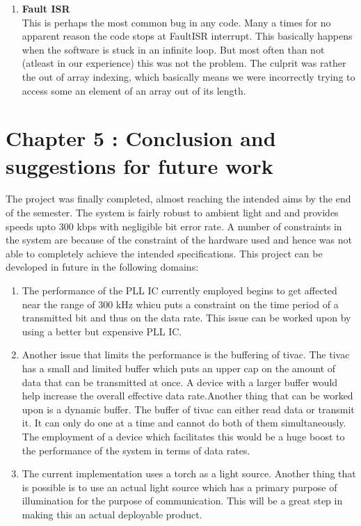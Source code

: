 \documentclass{article}
\begin{document}
\begin{enumerate}
\item \textbf{Fault ISR}\\
  This is perhaps the most common bug in any code. Many a times for no apparent reason the code stops at FaultISR interrupt. This basically happens when the software is stuck in an infinite loop. But most often than not (atleast in our experience) this was not the problem. The culprit was rather the out of array indexing, which basically means we were incorrectly trying to access some an element of an array out of its length. 
\end{enumerate}

\section{Chapter 5 : Conclusion and suggestions for future work}

The project was finally completed, almost reaching the intended aims by the end of the semester. The system is fairly robust to ambient light and and provides speeds upto $300$ kbps with negligible bit error rate. A number of constraints in the system are because of the constraint of the hardware used and hence was not able to completely achieve the intended specifications. This project can be developed in future in the following domains:
\begin{enumerate}
\item The performance of the PLL IC currently employed begins to get affected near the range of $300$ kHz whicu puts a constraint on the time period of a transmitted bit and thus on the data rate. This issue can be worked upon by using a better but expensive PLL IC.
\item Another issue that limits the performance is the buffering of tivac. The tivac has a small and limited buffer which puts an upper cap on the amount of data that can be transmitted at once. A device with a larger buffer would help increase the overall effective data rate.Another thing that can be worked upon is a dynamic buffer. The buffer of tivac can either read data or transmit it. It can only do one at a time and cannot do both of them simultaneously. The employment of a device which facilitates this would be a huge boost to the performance of the system in terms of data rates.
\item The current implementation uses a torch as a light source. Another thing that is possible is to use an actual light source which has a primary purpose of illumination for the purpose of communication. This will be a great step in making this an actual deployable product. 
\end{enumerate}
\end{document}
